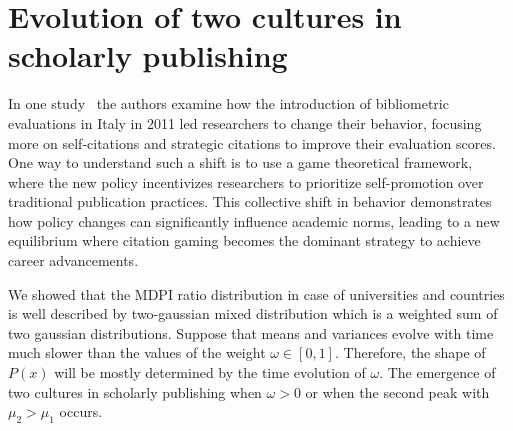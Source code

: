\documentclass[amsfonts, amssymb, prl, superscriptaddress, notitlepage, twocolumn, nofootinbib]{revtex4-2}
\begin{document}

\section{Evolution of two cultures in scholarly publishing }
In one study~\cite{baccini2019citation} the authors examine how the introduction of bibliometric evaluations in Italy in 2011 led researchers to change their behavior, focusing more on self-citations and strategic citations to improve their evaluation scores. One way to understand such a shift is to use a game theoretical framework, where the new policy incentivizes researchers to prioritize self-promotion over traditional publication practices. This collective shift in behavior demonstrates how policy changes can significantly influence academic norms, leading to a new equilibrium where citation gaming becomes the dominant strategy to achieve career advancements. 

We showed that the MDPI ratio distribution in case of universities and countries is well described by two-gaussian mixed distribution which is a weighted sum of two gaussian distributions. Suppose that means and variances evolve with time much slower than the values of the weight $\omega\in [0, 1]$.  Therefore, the shape of $P(x)$ will be mostly determined by the time evolution of $\omega$. The emergence of two cultures in scholarly publishing when $\omega > 0$ or when the second peak with $\mu_2 >\mu_1$ occurs.  
\end{document}
